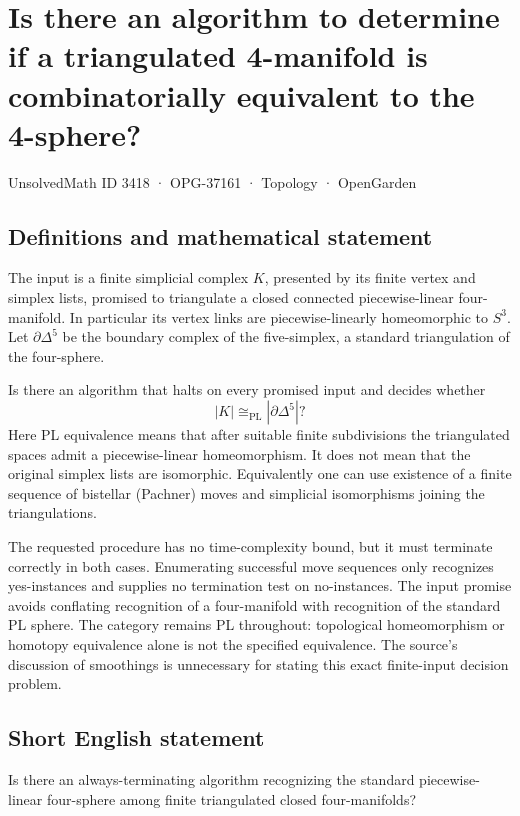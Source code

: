 \documentclass[11pt,a4paper]{article}
\begin{document}
\section*{Is there an algorithm to determine if a triangulated 4-manifold is combinatorially equivalent to the 4-sphere?}\label{3418}
{\small UnsolvedMath ID 3418 · OPG-37161 · Topology · OpenGarden}
\subsection{Definitions and mathematical statement}
The input is a finite simplicial complex $K$, presented by its finite
vertex and simplex lists, promised to triangulate a closed connected
piecewise-linear four-manifold. In particular its vertex links are
piecewise-linearly homeomorphic to $S^3$. Let $\partial\Delta^5$ be
the boundary complex of the five-simplex, a standard triangulation
of the four-sphere.

Is there an algorithm that halts on every promised input and decides
whether
\[
                         |K|\cong_{\mathrm{PL}}|\partial\Delta^5|?
\]
Here PL equivalence means that after suitable finite subdivisions
the triangulated spaces admit a piecewise-linear homeomorphism.
It does not mean that the original simplex lists are isomorphic.
Equivalently one can use existence of a finite sequence of bistellar
(Pachner) moves and simplicial isomorphisms joining the triangulations.

The requested procedure has no time-complexity bound, but it must
terminate correctly in both cases. Enumerating successful move
sequences only recognizes yes-instances and supplies no termination
test on no-instances. The input promise avoids conflating recognition
of a four-manifold with recognition of the standard PL sphere.
The category remains PL throughout: topological homeomorphism or
homotopy equivalence alone is not the specified equivalence.
The source's discussion of smoothings is unnecessary for stating
this exact finite-input decision problem.
\subsection{Short English statement}
Is there an always-terminating algorithm recognizing the standard piecewise-linear four-sphere among finite triangulated closed four-manifolds?
\end{document}
